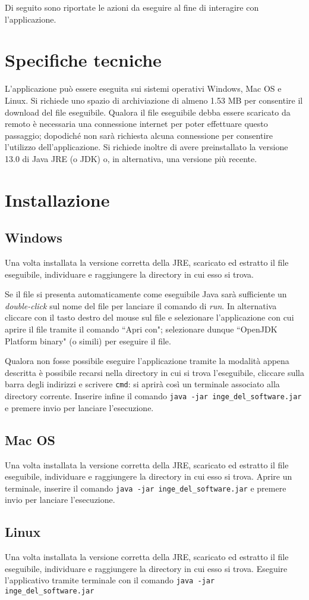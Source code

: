 Di seguito sono riportate le azioni da eseguire al fine di interagire con l'applicazione. 

\section{Specifiche tecniche}
L'applicazione può essere eseguita sui sistemi operativi Windows, Mac OS e Linux.\newline
Si richiede uno spazio di archiviazione di almeno 1.53 MB per consentire il download del file eseguibile. 
Qualora il file eseguibile debba essere scaricato da remoto è necessaria una connessione internet per poter effettuare questo passaggio; dopodiché non sarà richiesta alcuna connessione per consentire l'utilizzo dell'applicazione.\newline
Si richiede inoltre di avere preinstallato la versione 13.0 di Java JRE (o JDK) o, in alternativa, una versione più recente. 

\section{Installazione}
\subsection{Windows}
Una volta installata la versione corretta della JRE, scaricato ed estratto il file eseguibile, individuare e raggiungere la directory in cui esso si trova.

Se il file si presenta automaticamente come eseguibile Java sarà sufficiente un \textit{double-click} sul nome del file per lanciare il comando di \textit{run}. In alternativa cliccare con il tasto destro del mouse sul file e selezionare l'applicazione con cui aprire il file tramite il comando ``Apri con"; selezionare dunque ``OpenJDK Platform binary" (o simili) per eseguire il file.\newline

Qualora non fosse possibile eseguire l'applicazione tramite la modalità appena descritta è possibile recarsi nella directory in cui si trova l'eseguibile, cliccare sulla barra degli indirizzi e scrivere \texttt{cmd}: si aprirà così un terminale associato alla directory corrente. Inserire infine il comando \texttt{java -jar inge\_del\_software.jar} e premere invio per lanciare l'esecuzione.


\subsection{Mac OS}
Una volta installata la versione corretta della JRE, scaricato ed estratto il file eseguibile, individuare e raggiungere la directory in cui esso si trova. Aprire un terminale, inserire il comando \texttt{java -jar inge\_del\_software.jar} e premere invio per lanciare l'esecuzione.

\subsection{Linux}
Una volta installata la versione corretta della JRE, scaricato ed estratto il file eseguibile, individuare e raggiungere la directory in cui esso si trova. Eseguire l’applicativo tramite terminale con il comando \texttt{java -jar inge\_del\_software.jar}